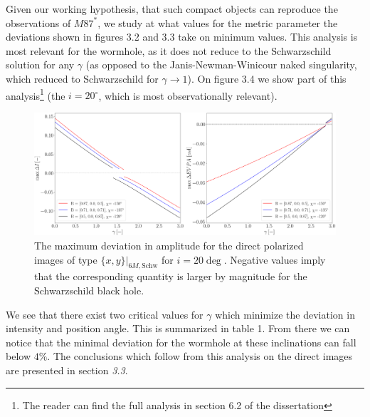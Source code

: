 \documentclass[12pt]{article}
\numberwithin{equation}{section}
\numberwithin{figure}{section}
\begin{document}
	\newpage
	
	Given our working hypothesis, that such compact objects can reproduce the observations of $M87^*$, we study at what values for the metric parameter the deviations shown in figures 3.2 and 3.3 take on minimum values. This analysis is most relevant for the wormhole, as it does not reduce to the Schwarzschild solution for any $\gamma$ (as opposed to the Janis-Newman-Winicour naked singularity, which reduced to Schwarzschild for $\gamma \rightarrow 1$). On figure 3.4 we show part of this analysis\footnote{The reader can find the full analysis in section 6.2 of the dissertation} (the $i = 20^\circ$, which is most observationally relevant).
	
	\begin{figure}[!htb]
		\centering
		\includegraphics[scale = 0.22]{Section_7_Polarized_Emission/WH_20_deg_param_sweep.png}
		\caption[The maximum deviation of the direct images of type $\{x,y\}\vert_{6M, \text{Schw}}$, for $i = 20\deg$.]{\small
			The maximum deviation in amplitude for the direct polarized images of type $\{x,y\}\vert_{6M, \text{Schw}}$ for $i = 20\deg$. Negative values imply that the corresponding quantity is larger by magnitude for the Schwarzschild black hole.} 
		\label{WH_max_deviation_70_deg}
	\end{figure}
	
	We see that there exist two critical values for $\gamma$ which minimize the deviation in intensity and position angle. This is summarized in table 1. From there we can notice that the minimal deviation for the wormhole at these inclinations can fall below $4\%$. The conclusions which follow from this analysis on the direct images are presented in section \emph{3.3}.
	
\end{document}
